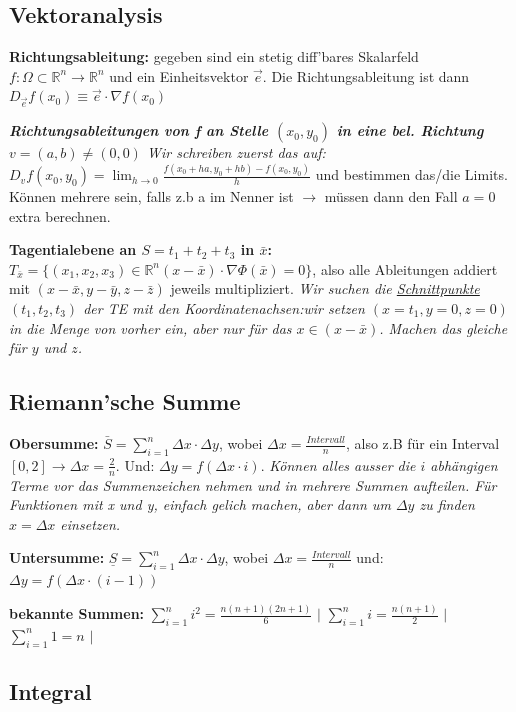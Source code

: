 \documentclass[a3paper, ngerman, 8pt]{article}
\begin{document}
\begin{multicols*}{3}
\subsection*{Vektoranalysis}
\textbf{Richtungsableitung:} gegeben sind ein stetig diff'bares Skalarfeld $ f: \Omega \subset \mathbb{R}^n \to \mathbb{R}^n$ und ein Einheitsvektor $\vec{e}$. Die Richtungsableitung ist dann $D_{\vec{e}}f(x_0)\equiv\vec{e} \cdot \nabla f(x_0)$

\textit{\textbf{Richtungsableitungen von f an Stelle $(x_0,y_0)$ in eine bel. Richtung $v=(a,b)\neq (0,0)$} Wir schreiben zuerst das auf: $D_vf(x_0, y_0)=\lim_{h \to 0}\frac{f(x_0+ha, y_0+hb)-f(x_0, y_0)}{h}$} und bestimmen das/die Limits. Können mehrere sein, falls z.b a im Nenner ist $\to$ müssen dann den Fall $a=0$ extra berechnen. 

\textbf{Tagentialebene an $S=t_1+t_2+t_3$  in $\bar{x}$:} $T_{\bar{x}} = \{(x_1, x_2, x_3)\in \mathbb{R}^n (x-\bar{x})\cdot \nabla \Phi(\bar{x})=0\}$, also alle Ableitungen addiert mit $ (x-\bar{x}, y-\bar{y}, z-\bar{z})$ jeweils multipliziert. \textit{Wir suchen die \underline{Schnittpunkte $(t_1, t_2, t_3)$} der TE mit den Koordinatenachsen:wir setzen $(x=t_1, y=0, z=0)$ in die Menge von vorher ein, aber nur für das $x\in(x-\bar{x})$. Machen das gleiche für $y$ und $z$. }

\subsection*{Riemann'sche Summe}
\textbf{Obersumme:} $\bar{S}=\sum_{i=1}^{n} \Delta x \cdot \Delta y$, wobei $\Delta x = \frac{Intervall}{n}$, also z.B für ein Interval $[0,2] \to \Delta x = \frac{2}{n}$. Und: $\Delta y = f(\Delta x \cdot i)$.
\textit{Können alles ausser die $i$ abhängigen Terme vor das Summenzeichen nehmen und in mehrere Summen aufteilen. Für Funktionen mit x und y, einfach gelich machen, aber dann um $\Delta y$ zu finden $x=\Delta x$ einsetzen.}

\textbf{Untersumme:} $\underline{S}=\sum_{i=1}^{n} \Delta x \cdot \Delta y$, wobei $\Delta x = \frac{Intervall}{n}$ und: $\Delta y = f(\Delta x \cdot (i-1))$


\textbf{bekannte Summen:} $\sum_{i=1}^{n} i^2 = \frac{n(n+1)(2n+1)}{6}$ $\big \vert$ $\sum_{i=1}^{n} i = \frac{n(n+1)}{2}$  $\big \vert$ $\sum_{i=1}^{n} 1=n$ $\big \vert$ 

\subsection*{Integral}


\end{multicols*}
\end{document}
